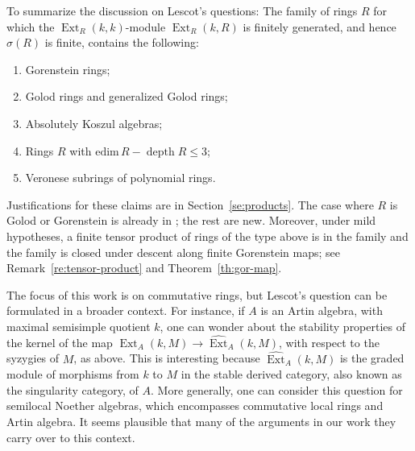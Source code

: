 \documentclass{amsart}
\numberwithin{equation}{section}
\theoremstyle{plain}
\theoremstyle{definition}
\theoremstyle{remark}
\newcommand{\depth}{\operatorname{depth}}
\newcommand{\ext}{\operatorname{Ext}}
\begin{document}
To summarize the discussion on Lescot's questions: The family of rings $R$ for which the $\ext_R(k,k)$-module $\ext_R(k,R)$ is finitely generated, and hence $\sigma(R)$ is finite, contains the following:
    \begin{enumerate}[\quad\rm(1)]
        \item
        Gorenstein rings;
        \item 
        Golod rings and generalized Golod rings;
        \item
        Absolutely Koszul algebras;
        \item 
        Rings $R$ with $\mathrm{edim}\, R - \depth R \le 3$;
        \item
        Veronese subrings of polynomial rings.
    \end{enumerate}
    Justifications for these claims are in Section~\ref{se:products}. The case where $R$ is Golod or Gorenstein is already in \cite{Lescot:1986}; the rest are new. Moreover, under mild hypotheses, a finite tensor product of rings of the type above is in the family and   the family is closed under descent along finite Gorenstein maps; see Remark~\ref{re:tensor-product} and Theorem~\ref{th:gor-map}.

The focus of this work is on commutative rings, but Lescot's question can be formulated in a broader context. For instance, if $A$ is an Artin algebra, with  maximal semisimple quotient $k$, one can wonder about the stability properties of the kernel of the map $\ext_A(k,M)\to \widehat{\ext}_A(k,M)$, with respect to the syzygies of $M$, as above. This is interesting because $\widehat{\ext}_A(k,M)$ is the graded module of morphisms from $k$ to $M$ in the stable derived category, also known as the singularity category, of $A$. More generally, one can consider this question for semilocal Noether algebras, which encompasses commutative local rings and Artin algebra. It seems plausible that many of the arguments in our work they carry over to this context.

\end{document}
